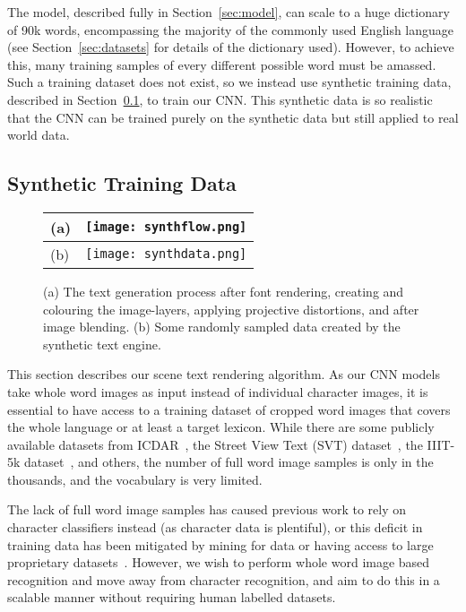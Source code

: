 \documentclass[twocolumn]{svjour3}          \smartqed  \usepackage{epsfig}
\begin{document}
The model, described fully in Section~\ref{sec:model}, can scale to a huge dictionary of 90k words, encompassing the majority of the commonly used English language (see Section~\ref{sec:datasets} for details of the dictionary used). However, to achieve this, many training samples of every different possible word must be amassed. Such a training dataset does not exist, so we instead use synthetic training data, described in Section~\ref{sec:synthdata}, to train our CNN. This synthetic data is so realistic that the CNN can be trained purely on the synthetic data but still applied to real world data.

\subsection{Synthetic Training Data}
\label{sec:synthdata}

\begin{figure*}
\centering
\begin{tabular}{>{\centering}m{10pt}m{}}
(a) & \texttt{[image: synthflow.png]}\\
\hline
(b) & \texttt{[image: synthdata.png]}\\
\end{tabular}
\vspace*{-3mm}
\caption{(a) The text generation process after font rendering, creating and colouring the image-layers, applying projective distortions, and after image blending. (b) Some randomly sampled data created by the synthetic text engine.}
\label{fig:synthdata}
\end{figure*}

This section describes our scene text rendering algorithm. As our CNN models take whole word images as input instead of individual character images, it is essential to have access to a training dataset of cropped word images that covers the whole language or at least a target lexicon. While there are some publicly available datasets from ICDAR~\cite{ICDAR03, ICDAR2005, ICDAR11, ICDAR2013}, the Street View Text (SVT) dataset~\cite{Wang11}, the IIIT-5k dataset~\cite{Mishra12}, and others, the number of full word image samples is only in the thousands, and the vocabulary is very limited. 

The lack of full word image samples has caused previous work to rely on character classifiers instead (as character data is plentiful), or this deficit in training data has been mitigated by mining for data or having access to large proprietary datasets~\cite{Jaderberg14a,Bissacco13,Goodfellow13}. However, we wish to perform whole word image based recognition and move away from character recognition, and aim to do this in a scalable manner without requiring human labelled datasets.
\end{document}
